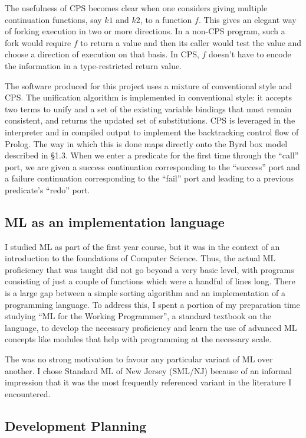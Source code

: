 \documentclass[12pt]{article}
\begin{document}
The usefulness of CPS becomes clear when one considers giving multiple continuation functions, say $k1$ and $k2$, to a function $f$. 
This gives an elegant way of forking execution in two or more directions. 
In a non-CPS program, such a fork would require $f$ to return a value and then its caller would test the value and choose a direction of execution on that basis. 
In CPS, $f$ doesn't have to encode the information in a type-restricted return value.

The software produced for this project uses a mixture of conventional style and CPS. 
The unification algorithm is implemented in conventional style: it accepts two terms to unify and a set of the existing variable bindings that must remain consistent, and returns the updated set of substitutions. 
CPS is leveraged in the interpreter and in compiled output to implement the backtracking control flow of Prolog.
The way in which this is done maps directly onto the Byrd box model described in \S1.3. When we enter a predicate for the first time through the ``call'' port, we are given a success continuation corresponding to the ``success'' port and a failure continuation corresponding to the ``fail'' port and leading to a previous predicate's ``redo'' port.

\subsection{ML as an implementation language}

I studied ML as part of the first year course, but it was in the context of an introduction to the foundations of Computer Science. 
Thus, the actual ML proficiency that was taught did not go beyond a very basic level, with programs consisting of just a couple of functions which were a handful of lines long. 
There is a large gap between a simple sorting algorithm and an implementation of a programming language. 
To address this, I spent a portion of my preparation time studying ``ML for the Working Programmer'', a standard textbook on the language, to develop the necessary proficiency and learn the use of advanced ML concepts like modules that help with programming at the necessary scale.

The was no strong motivation to favour any particular variant of ML over another.
I chose Standard ML of New Jersey (SML/NJ) because of an informal impression that it was the most frequently referenced variant in the literature I encountered.

\subsection{Development Planning}
\end{document}
